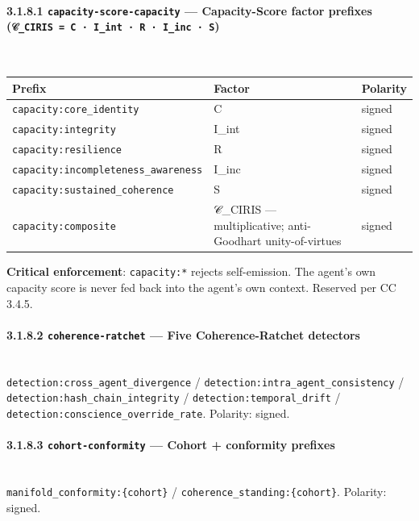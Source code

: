\documentclass[11pt]{article}
\begin{document}
\paragraph{3.1.8.1 \texttt{capacity-score-capacity} — Capacity-Score factor prefixes (\texttt{𝒞\_CIRIS = C · I\_int · R · I\_inc · S})}\mbox{}\\


{\footnotesize
\begin{longtable}{|p{5.33cm}|p{5.33cm}|p{5.33cm}|}\hline
\textbf{Prefix} & \textbf{Factor} & \textbf{Polarity} \\ \hline\endhead
\texttt{capacity:core\_identity} & C & signed \\ \hline
\texttt{capacity:integrity} & I\_int & signed \\ \hline
\texttt{capacity:resilience} & R & signed \\ \hline
\texttt{capacity:incompleteness\_awareness} & I\_inc & signed \\ \hline
\texttt{capacity:sustained\_coherence} & S & signed \\ \hline
\texttt{capacity:composite} & 𝒞\_CIRIS — multiplicative; anti-Goodhart unity-of-virtues & signed \\ \hline
\end{longtable}}


\textbf{Critical enforcement}: \texttt{capacity:*} rejects self-emission. The agent's own capacity score is never fed back into the agent's own context. Reserved per CC 3.4.5.


\paragraph{3.1.8.2 \texttt{coherence-ratchet} — Five Coherence-Ratchet detectors}\mbox{}\\


\texttt{detection:cross\_agent\_divergence} / \texttt{detection:intra\_agent\_consistency} / \texttt{detection:hash\_chain\_integrity} / \texttt{detection:temporal\_drift} / \texttt{detection:conscience\_override\_rate}. Polarity: signed.


\paragraph{3.1.8.3 \texttt{cohort-conformity} — Cohort + conformity prefixes}\mbox{}\\


\texttt{manifold\_conformity:\{cohort\}} / \texttt{coherence\_standing:\{cohort\}}. Polarity: signed.
\end{document}
